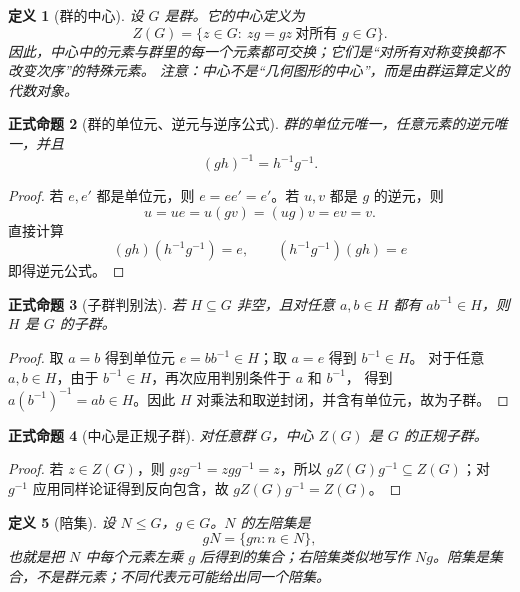 \documentclass[UTF8,fontset=none,a4paper,11pt]{ctexart}
\theoremstyle{foundation-definition}
\newtheorem{definition}{定义}[section]
\theoremstyle{foundation-theorem}
\theoremstyle{foundation-proposition}
\newtheorem{proposition}[definition]{正式命题}
\theoremstyle{foundation-example}
\theoremstyle{foundation-remark}
\theoremstyle{foundation-theorem}
\begin{document}
\begin{definition}[群的中心]\label{def:center}
设 \(G\) 是群。它的中心定义为
\[
Z(G)=\{z\in G:\ zg=gz\ \text{对所有 }g\in G\}.
\]
因此，中心中的元素与群里的每一个元素都可交换；它们是“对所有对称变换都不改变次序”的特殊元素。
注意：中心不是“几何图形的中心”，而是由群运算定义的代数对象。
\end{definition}

\begin{proposition}[群的单位元、逆元与逆序公式]\label{prop:group-identities}
群的单位元唯一，任意元素的逆元唯一，并且
\[
(gh)^{-1}=h^{-1}g^{-1}.
\]
\end{proposition}

\begin{proof}
若 \(e,e'\) 都是单位元，则 \(e=ee'=e'\)。若 \(u,v\) 都是 \(g\) 的逆元，则
\[
u=ue=u(gv)=(ug)v=ev=v.
\]
直接计算
\[
(gh)(h^{-1}g^{-1})=e,\qquad
(h^{-1}g^{-1})(gh)=e
\]
即得逆元公式。
\end{proof}

\begin{proposition}[子群判别法]\label{prop:subgroup-criterion}
若 \(H\subseteq G\) 非空，且对任意 \(a,b\in H\) 都有 \(ab^{-1}\in H\)，则 \(H\) 是
\(G\) 的子群。
\end{proposition}

\begin{proof}
取 \(a=b\) 得到单位元 \(e=bb^{-1}\in H\)；取 \(a=e\) 得到 \(b^{-1}\in H\)。
对于任意 \(a,b\in H\)，由于 \(b^{-1}\in H\)，再次应用判别条件于 \(a\) 和 \(b^{-1}\)，
得到 \(a(b^{-1})^{-1}=ab\in H\)。因此 \(H\) 对乘法和取逆封闭，并含有单位元，故为子群。
\end{proof}

\begin{proposition}[中心是正规子群]\label{prop:center-normal}
对任意群 \(G\)，中心 \(Z(G)\) 是 \(G\) 的正规子群。
\end{proposition}

\begin{proof}
若 \(z\in Z(G)\)，则 \(gzg^{-1}=zgg^{-1}=z\)，所以
\(gZ(G)g^{-1}\subseteq Z(G)\)；对 \(g^{-1}\) 应用同样论证得到反向包含，故
\(gZ(G)g^{-1}=Z(G)\)。
\end{proof}

\begin{definition}[陪集]\label{def:coset}
设 \(N\leq G\)，\(g\in G\)。\(N\) 的左陪集是
\[
gN=\{gn:n\in N\},
\]
也就是把 \(N\) 中每个元素左乘 \(g\) 后得到的集合；右陪集类似地写作 \(Ng\)。陪集是集合，不是群元素；不同代表元可能给出同一个陪集。
\end{definition}
\end{document}
